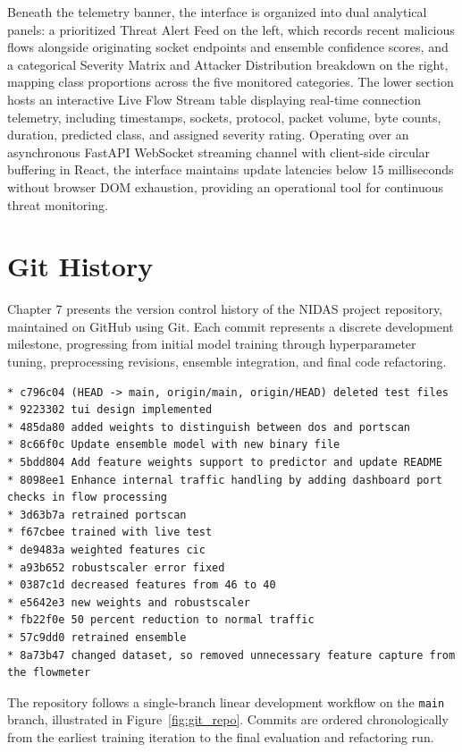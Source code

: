 \documentclass[12pt,a4paper]{report}
\begin{document}
Beneath the telemetry banner, the interface is organized into dual analytical panels: a prioritized Threat Alert Feed on the left, which records recent malicious flows alongside originating socket endpoints and ensemble confidence scores, and a categorical Severity Matrix and Attacker Distribution breakdown on the right, mapping class proportions across the five monitored categories. The lower section hosts an interactive Live Flow Stream table displaying real-time connection telemetry, including timestamps, sockets, protocol, packet volume, byte counts, duration, predicted class, and assigned severity rating. Operating over an asynchronous FastAPI WebSocket streaming channel with client-side circular buffering in React, the interface maintains update latencies below 15 milliseconds without browser DOM exhaustion, providing an operational tool for continuous threat monitoring.

\newpage
\chapter{Git History}

Chapter 7 presents the version control history of the NIDAS project repository, maintained on GitHub using Git. Each commit represents a discrete development milestone, progressing from initial model training through hyperparameter tuning, preprocessing revisions, ensemble integration, and final code refactoring.

{\scriptsize
\begin{verbatim}
* c796c04 (HEAD -> main, origin/main, origin/HEAD) deleted test files
* 9223302 tui design implemented
* 485da80 added weights to distinguish between dos and portscan
* 8c66f0c Update ensemble model with new binary file
* 5bdd804 Add feature weights support to predictor and update README
* 8098ee1 Enhance internal traffic handling by adding dashboard port checks in flow processing
* 3d63b7a retrained portscan
* f67cbee trained with live test
* de9483a weighted features cic
* a93b652 robustscaler error fixed
* 0387c1d decreased features from 46 to 40
* e5642e3 new weights and robustscaler
* fb22f0e 50 percent reduction to normal traffic
* 57c9dd0 retrained ensemble
* 8a73b47 changed dataset, so removed unnecessary feature capture from the flowmeter
\end{verbatim}
}

The repository follows a single-branch linear development workflow on the \texttt{main} branch, illustrated in Figure~\ref{fig:git_repo}. Commits are ordered chronologically from the earliest training iteration to the final evaluation and refactoring run.
\end{document}
